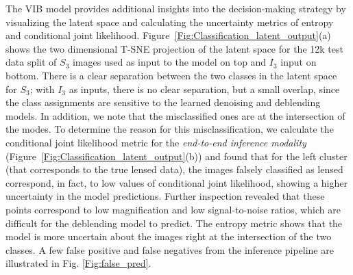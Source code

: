 \documentclass[12pt, twocolumn, apj]{openjournal}
\begin{document}
The VIB model provides additional insights into the decision-making strategy by visualizing the latent space and calculating the uncertainty metrics of entropy and conditional joint likelihood. Figure~\ref{Fig:Classification_latent_output}(a) shows the two dimensional T-SNE projection of the latent space for the 12k test data split of $S_3$ images used as input to the model on top and $I_3$ input on bottom. There is a clear separation between the two classes in the latent space for $S_3$; with $I_3$ as inputs, there is no clear separation, but a small overlap, since the class assignments are sensitive to the learned denoising and deblending models. In addition, we note that the misclassified ones are at the intersection of the modes. To determine the reason for this misclassification, we calculate the conditional joint likelihood metric for the \emph{end-to-end inference modality} (Figure~\ref{Fig:Classification_latent_output}(b)) and found that for the left cluster (that corresponds to the true lensed data), the images falsely classified as lensed correspond, in fact, to low values of conditional joint likelihood, showing a higher uncertainty in the model predictions. Further inspection revealed that these points correspond to low magnification and low signal-to-noise ratios, which are difficult for the deblending model to predict. The entropy metric shows that the model is more uncertain about the images right at the intersection of the two classes. A few false positive and false negatives from the inference pipeline are illustrated in Fig. \ref{Fig:false_pred}.

\end{document}
